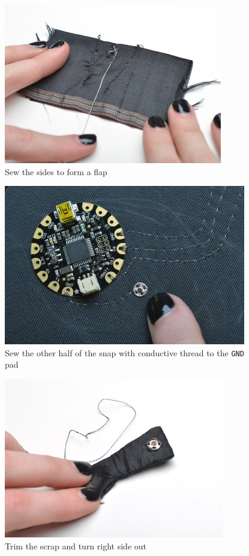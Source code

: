 \documentclass[letterpaper,twoside,12pt]{article}
\begin{document}
\begin{figure}[hbpt]\begin{centering}%
\includegraphics[height=2.75in]{flora-angler-embroidery-20.jpg}
\caption{Sew the sides to form a flap}
\label{fig:flora-angler-embroidery-20}
\end{centering}\end{figure}
\begin{figure}[hbpt]\begin{centering}%
\includegraphics[height=2.75in]{flora-angler-embroidery-21a.jpg}
\caption{Sew the other half of the snap with conductive thread to the 
\texttt{GND} pad}
\label{fig:flora-angler-embroidery-21a}
\end{centering}\end{figure}
\begin{figure}[hbpt]\begin{centering}%
\includegraphics[height=2.75in]{flora-angler-embroidery-21.jpg}
\caption{Trim the scrap and turn right side out}
\label{fig:flora-angler-embroidery-21}
\end{centering}\end{figure}
\end{document}
